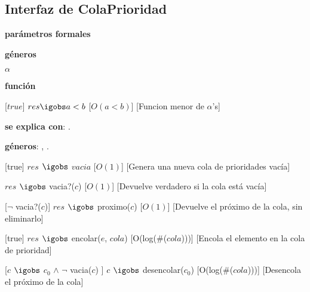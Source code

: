 \begin{Interfaz}
\subsection{Interfaz de ColaPrioridad}

  \textbf{par\'ametros formales}\parindent\\
  \parbox{1.7cm}{\textbf{g\'eneros}} $\alpha$\\
  \parbox[t]{1.7cm}{\textbf{funci\'on}}\parbox[t]{\textwidth-2\parindent-1.7cm}{%
    [$true$]
    {$res \igobs a < b$}
    [$O(a < b)$]
    [Funcion menor de $\alpha$'s]
  }

\textbf{se explica con}: .

\textbf{g\'eneros}: , .



%
[true]   %
{$res$ $\igobs$ $vacia$} %
[$O(1)$]   %
[Genera una nueva cola de prioridades vac\'ia]  %

{$res$ $\igobs$ vacia?($c$)}
[$O(1)$]
[Devuelve verdadero si la cola est\'a vac\'ia]

[$\neg$ vacia?($c$)]  
{$res$ $\igobs$ proximo($c$)}  %
[$O(1)$]
[Devuelve el pr\'oximo de la cola, sin eliminarlo]

%
[true]   %
{$res$ $\igobs$ encolar($e$, $cola$)} %
[O(log($\#$($cola$)))]   %
[Encola el elemento en la cola de prioridad]  %

[$c$ $\igobs$ $c_0$ $\land$ $\neg$ vacia($c$) ]  
{$c$ $\igobs$ desencolar($c_0$)} 
[O(log($\#$($cola$)))]   %
[Desencola el pr\'oximo de la cola]


$ $\newline
$ $\newline




\begin{tad}{}



\end{tad}

\end{Interfaz}